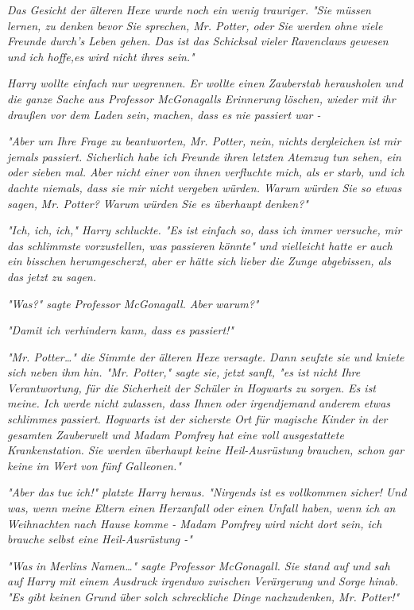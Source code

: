 {\emph{Das Gesicht der älteren Hexe wurde noch ein wenig trauriger. "Sie müssen lernen, zu denken bevor Sie sprechen, Mr. Potter, oder Sie werden ohne viele Freunde durch's Leben gehen. Das ist das Schicksal vieler} \emph{Ravenclaws gewesen und ich hoffe,es wird nicht ihres sein."}

\emph{Harry wollte einfach nur wegrennen. Er wollte einen Zauberstab herausholen und die ganze Sache aus Professor McGonagalls Erinnerung löschen, wieder mit ihr draußen vor dem Laden sein,} \emph{\emph{machen, dass es nie passiert war -}}

\emph{"Aber um Ihre Frage zu beantworten, Mr. Potter, nein, nichts} \emph{\emph{dergleichen}} \emph{ist mir jemals passiert. Sicherlich habe ich Freunde ihren letzten Atemzug tun sehen, ein oder sieben mal. Aber nicht einer von ihnen verfluchte mich, als er starb, und ich dachte niemals, dass sie mir nicht vergeben würden. Warum würden Sie so etwas} \emph{\emph{sagen,}} \emph{Mr. Potter? Warum würden Sie es überhaupt} \emph{\emph{denken?}"}

\emph{"Ich, ich, ich," Harry schluckte. "Es ist einfach so, dass ich immer versuche, mir das schlimmste vorzustellen, was passieren könnte" und vielleicht hatte er auch ein bisschen herumgescherzt, aber er hätte sich lieber die Zunge abgebissen, als das jetzt zu sagen.}

\emph{"Was?" sagte Professor McGonagall. Aber} \emph{\emph{warum?}"}

\emph{"Damit ich verhindern kann, dass es passiert!"}

\emph{"Mr. Potter…" die Simmte der älteren Hexe versagte. Dann seufzte sie und kniete sich neben ihm hin. "Mr. Potter," sagte sie, jetzt sanft, "es ist nicht Ihre Verantwortung, für die Sicherheit der Schüler in Hogwarts zu sorgen. Es ist meine. Ich werde nicht zulassen, dass Ihnen oder irgendjemand anderem etwas schlimmes passiert. Hogwarts ist der sicherste Ort für magische Kinder in der gesamten Zauberwelt und Madam Pomfrey hat eine voll ausgestattete Krankenstation. Sie werden überhaupt keine Heil-Ausrüstung brauchen, schon gar keine im Wert von fünf Galleonen."}

\emph{"Aber das} \emph{\emph{tue}} \emph{ich!" platzte Harry heraus. "\emph{Nirgends}} \emph{ist es vollkommen sicher! Und was, wenn meine Eltern einen Herzanfall oder einen Unfall haben, wenn ich an Weihnachten nach Hause komme - Madam Pomfrey wird nicht dort sein, ich brauche selbst eine Heil-Ausrüstung -"}

\emph{"\emph{Was}} \emph{in Merlins Namen…" sagte Professor McGonagall. Sie stand auf und sah auf Harry mit einem Ausdruck irgendwo zwischen Verärgerung und Sorge hinab. "Es gibt keinen Grund über solch schreckliche Dinge nachzudenken, Mr. Potter!"}

}
